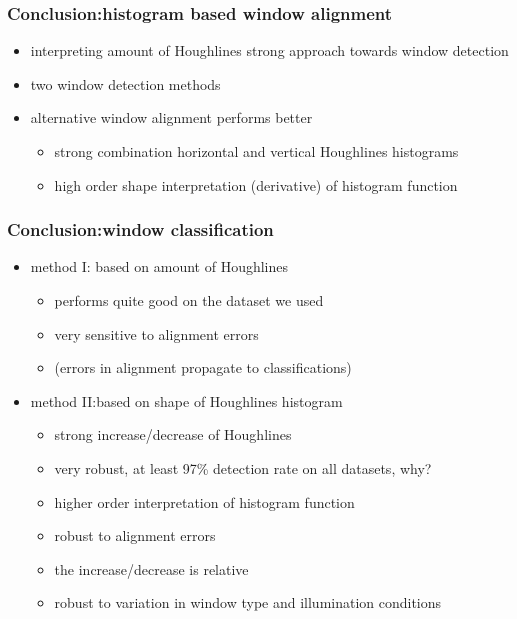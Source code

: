 \documentclass{beamer}
\begin{document}
\frame
{
	\frametitle{Conclusion:histogram based window alignment}		

	\begin{itemize}
	\item <+-| alert@+> interpreting amount of Houghlines strong approach towards window
	detection
	\item <+-| alert@+> two window detection methods
	\item <+-| alert@+> alternative window alignment performs better
		\begin{itemize}
		\item <+-| alert@+> strong combination horizontal and vertical Houghlines histograms
		\item <+-| alert@+> high order shape interpretation (derivative) of histogram function
		\end{itemize}
	
	
	\end{itemize}

}
\frame
{
	\frametitle{Conclusion:window classification}		
	\begin{itemize}
	\item <+-| alert@+> method I: based on amount of Houghlines
		\begin{itemize}
		\item <+-| alert@+> performs quite good on the dataset we used
		\item <+-| alert@+> very sensitive to alignment errors
		\item <+-| alert@+> (errors in alignment propagate to classifications)
		\end{itemize}
	\item <+-| alert@+> method II:based on shape of Houghlines histogram
		\begin{itemize}
		\item <+-| alert@+> strong increase/decrease of Houghlines
		\item <+-| alert@+> very robust, at least 97\% detection rate on all datasets, why?
		\item <+-| alert@+> higher order interpretation of histogram function
		\item <+-| alert@+> robust to alignment errors 
		\item <+-| alert@+> the increase/decrease is relative
		\item <+-| alert@+> robust to variation in window type and illumination conditions
		\end{itemize}
	\end{itemize}
}
\end{document}
